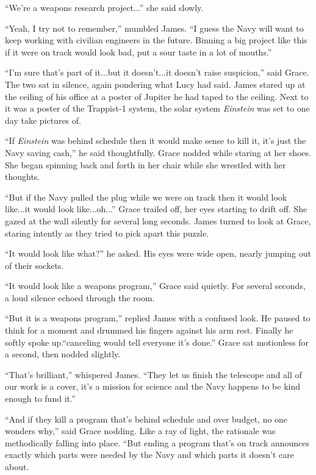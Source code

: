 \documentclass[openany, 12pt]{book} %
\begin{document}
``We're a weapons research project...'' she said slowly.

``Yeah, I try not to remember,'' mumbled James. ``I guess the Navy will want to keep working with civilian engineers in the future. Binning a big project like this if it were on track would look bad, put a sour taste in a lot of mouths.''

``I'm sure that's part of it...but it doesn't...it doesn't raise suspicion,'' said Grace. The two sat in silence, again pondering what Lucy had said. James stared up at the ceiling of his office at a poster of Jupiter he had taped to the ceiling. Next to it was a poster of the Trappist-1 system, the solar system \textit{Einstein} was set to one day take pictures of.

``If \textit{Einstein} was behind schedule then it would make sense to kill it, it's just the Navy saving cash,'' he said thoughtfully. Grace nodded while staring at her shoes. She began spinning back and forth in her chair while she wrestled with her thoughts.

``But if the Navy pulled the plug while we were on track then it would look like...it would look like...oh...'' Grace trailed off, her eyes starting to drift off. She gazed at the wall silently for several long seconds. James turned to look at Grace, staring intently as they tried to pick apart this puzzle.

``It would look like what?'' he asked. His eyes were wide open, nearly jumping out of their sockets.

``It would look like a weapons program,'' Grace said quietly. For several seconds, a loud silence echoed through the room.

``But it is a weapons program,'' replied James with a confused look. He paused to think for a moment and drummed his fingers against his arm rest. Finally he softly spoke up.``canceling would tell everyone it's done.'' Grace sat motionless for a second, then nodded slightly.

``That's brilliant,'' whispered James. ``They let us finish the telescope and all of our work is a cover, it's a mission for science and the Navy happens to be kind enough to fund it.''

``And if they kill a program that's behind schedule and over budget, no one wonders why,'' said Grace nodding. Like a ray of light, the rationale was methodically falling into place. ``But ending a program that's on track announces exactly which parts were needed by the Navy and which parts it doesn't care about.
\end{document}
